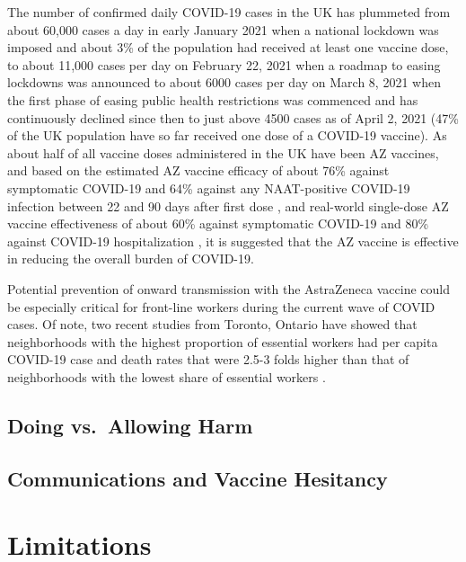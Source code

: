 \documentclass[]{interact}
\theoremstyle{plain}%
\theoremstyle{definition}
\theoremstyle{remark}
\begin{document}
The number of confirmed daily COVID-19 cases in the UK has plummeted
from about 60,000 cases a day in early January 2021 when a national
lockdown was imposed and about 3\% of the population had received at
least one vaccine dose, to about 11,000 cases per day on February 22,
2021 when a roadmap to easing lockdowns was announced to about 6000
cases per day on March 8, 2021 when the first phase of easing public
health restrictions was commenced \citep{bbc_lockdown_2021} and has
continuously declined since then to just above 4500 cases as of April 2,
2021 (47\% of the UK population have so far received one dose of a
COVID-19 vaccine). As about half of all vaccine doses administered in
the UK have been AZ vaccines, and based on the estimated AZ vaccine
efficacy of about 76\% against symptomatic COVID-19 and 64\% against any
NAAT-positive COVID-19 infection between 22 and 90 days after first dose
\citep{voysey_single-dose_2021}, and real-world single-dose AZ vaccine
effectiveness of about 60\% against symptomatic COVID-19 and 80\%
against COVID-19 hospitalization
\citep{public_health_england_1public_2021}, it is suggested that the AZ
vaccine is effective in reducing the overall burden of COVID-19.

Potential prevention of onward transmission with the AstraZeneca vaccine
could be especially critical for front-line workers during the current
wave of COVID cases. Of note, two recent studies from Toronto, Ontario
have showed that neighborhoods with the highest proportion of essential
workers had per capita COVID-19 case and death rates that were 2.5-3
folds higher than that of neighborhoods with the lowest share of
essential workers
\citep[\citet{rao_disproportionate_2021}]{chagla_characterizing_2021}.

\hypertarget{doing-vs.-allowing-harm}{%
\subsection{Doing vs.~Allowing Harm}\label{doing-vs.-allowing-harm}}

\hypertarget{communications-and-vaccine-hesitancy}{%
\subsection{Communications and Vaccine
Hesitancy}\label{communications-and-vaccine-hesitancy}}

\hypertarget{limitations}{%
\section{Limitations}\label{limitations}}
\end{document}
